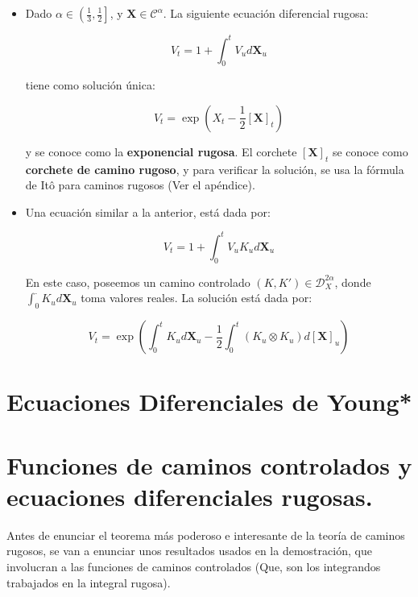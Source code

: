 \begin{itemize}

	\item Dado $\alpha \in \left( \frac{1}{3}, \frac{1}{2} \right]$, y $\mathbf{X} \in \mathscr{C}^{\alpha}$. La siguiente ecuación diferencial rugosa:

	\[
		V_t = 1 + \int_0^t V_u d\mathbf{X}_u
	\]

	tiene como solución única:

	\[
		V_t = \exp \left( X_t - \frac{1}{2} \left[ \mathbf{X} \right]_t \right)
	\]

	y se conoce como la \textbf{exponencial rugosa}. El corchete $[\mathbf{X}]_t$ se conoce como \textbf{corchete de camino rugoso}, y para verificar la solución, se usa la fórmula de Itô para caminos rugosos (Ver el apéndice).

	\item Una ecuación similar a la anterior, está dada por:

	\[
		V_t = 1 + \int_0^t V_u K_u d\mathbf{X}_u
	\]

	En este caso, poseemos un camino controlado $(K, K') \in \mathscr{D}^{2\alpha}_X$, donde $\int_0^{\cdot} K_u d\mathbf{X}_u$ toma valores reales. La solución está dada por:

	\[
		V_t = \exp \left( \int_0^t K_u d\mathbf{X}_u - \frac{1}{2} \int_0^t (K_u \otimes K_u) d[\mathbf{X}]_u  \right)
	\]

\end{itemize}





\section{Ecuaciones Diferenciales de Young*}



\section{Funciones de caminos controlados y ecuaciones diferenciales rugosas.}

Antes de enunciar el teorema más poderoso e interesante de la teoría de caminos rugosos, se van a enunciar unos resultados usados en la demostración, que involucran a las funciones de caminos controlados (Que, son los integrandos trabajados en la integral rugosa). \\


